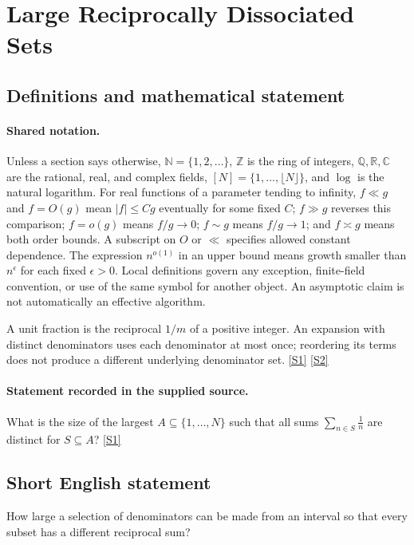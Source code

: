 \documentclass[11pt,a4paper]{article}
\newcommand{\N}{\mathbb{N}}
\newcommand{\Z}{\mathbb{Z}}
\newcommand{\Q}{\mathbb{Q}}
\newcommand{\R}{\mathbb{R}}
\newcommand{\C}{\mathbb{C}}
\newcommand{\sref}[2]{\hyperlink{source:#1:#2}{[S#2]}}
\begin{document}
\section{Large Reciprocally Dissociated Sets}\label{statement}


\subsection{Definitions and mathematical statement}

\paragraph{Shared notation.}Unless a section says otherwise, $\N=\{1,2,\ldots\}$,
$\Z$ is the ring of integers, $\Q,\R,\C$ are the rational, real, and complex
fields, $[N]=\{1,\ldots,\lfloor N\rfloor\}$, and $\log$ is the natural
logarithm. For real functions of a parameter tending to infinity,
$f\ll g$ and $f=O(g)$ mean $|f|\leq Cg$ eventually for some fixed $C$;
$f\gg g$ reverses this comparison; $f=o(g)$ means $f/g\to0$;
$f\sim g$ means $f/g\to1$; and $f\asymp g$ means both order bounds.
A subscript on $O$ or $\ll$ specifies allowed constant dependence.
The expression $n^{o(1)}$ in an upper bound means growth smaller than
$n^\epsilon$ for each fixed $\epsilon>0$. Local definitions govern any
exception, finite-field convention, or use of the same symbol for another
object. An asymptotic claim is not automatically an effective algorithm.



A unit fraction is the reciprocal $1/m$ of a positive integer. An expansion with distinct denominators uses each denominator at most once; reordering its terms does not produce a different underlying denominator set. \sref{statement}{1} \sref{statement}{2}

\paragraph{Statement recorded in the supplied source.}
What is the size of the largest $A\subseteq \{1,\ldots,N\}$ such that all sums $\sum_{n\in S}\frac{1}{n}$ are distinct for $S\subseteq A$? \sref{statement}{1}

\subsection{Short English statement}

How large a selection of denominators can be made from an interval so that every subset has a different reciprocal sum?
\end{document}
